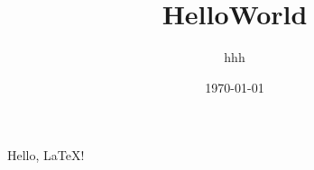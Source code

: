 \documentclass[12pt]{article}
\title{HelloWorld}
\author{hhh}
\date{\today}
\begin{document}
Hello, \LaTeX!
\end{document}
